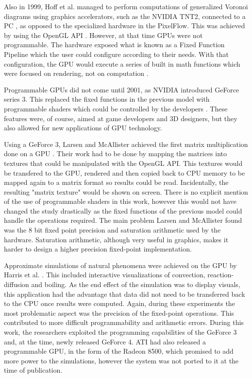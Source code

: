 Also in 1999, Hoff et al. \cite{voronoi_diagrams_gpgpu} managed to perform computations of generalized Voronoi diagrams using graphics accelerators, such as the NVIDIA TNT2, connected to a PC \cite{brief_history_gpgpu}, as opposed to the specialized hardware in the PixelFlow. This was achieved by using the OpenGL API \cite{opengl}. However, at that time GPUs were not programmable. The hardware exposed what is known as a Fixed Function Pipeline which the user could configure according to their needs. With that configuration, the GPU would execute a series of built in math functions which were focused on rendering, not on computation \cite{opengl_fixed_function_pipeline}.

Programmable GPUs did not come until 2001, as NVIDIA introduced GeForce series 3. This replaced the fixed functions in the previous model with programmable shaders which could be controlled by the developers \cite{nvidia_nfinitefx_pixel, nvidia_nfinitefx_vertex}. These features were, of course, aimed at game developers and 3D designers, but they also allowed for new applications of GPU technology.

Using a GeForce 3, Larsen and McAllister achieved the first matrix multiplication done on a GPU \cite{early_matrix_multiplication_gpgpu}. Their work had to be done by mapping the matrices into textures that could be manipulated with the OpenGL API. This textures would be transfered to the GPU, rendered and then copied back to CPU memory to be mapped again to a matrix format so results could be read. Incidentally, the resulting "matrix texture" would be shown on screen. There is no explicit mention of the use of programmable shaders in this work, however this would not have changed the study drastically as the fixed functions of the previous model could handle the operations required. The main problem Larsen and McAllister found was the 8 bit fixed point precision and saturation arithmetic used by the hardware. Saturation arithmetic, although very useful in graphics, makes it harder to design a higher precision fixed-point implementation.

Approximate simulations of natural phenomena were achieved on the GPU by Harris et al. \cite {physics_simulations_gpgpu}. This included interactive visualizations of convection, reaction-diffusion and boiling. As the end effect of the simulation was to display visuals, this application had the advantage that data did not need to be transferred back to the CPU once results were computed. Again, during these experiments the most problematic aspect was the precision of the fixed-point operations. This contributed to more difficult programmability and arithmetic errors. During this work, the researchers exploited the programming capabilities of the GeForce 3 and, at the time, newly released GeForce 4. ATI had also released a programmable GPU, in the form of the Radeon 8500, which promised to add more power to the simulations, however the system was not ported to it at the time of publication. 

